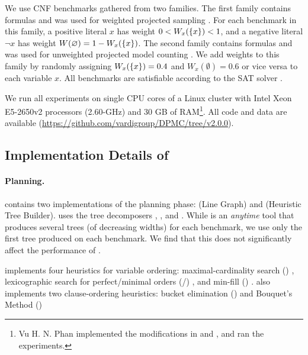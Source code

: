 We use \benchmarks{} CNF benchmarks gathered from two families.
The first family contains \wapsBenchmarks{} formulas and was used for weighted projected sampling \cite{gupta2019waps}.
For each benchmark in this family, a positive literal $x$ has weight $0 < W_x(\left\{ x \right\}) < 1$, and a negative literal $\neg x$ has weight $W(\varnothing) = 1 - W_x(\left\{ x \right\})$.
The second family contains \birdBenchmarks{} formulas and was used for unweighted projected model counting \cite{soos2019bird}.
We add weights to this family by randomly assigning $W_x(\left\{ x \right\}) = 0.4$ and $W_x(\emptyset) = 0.6$ or vice versa to each variable $x$.
All \benchmarks{} benchmarks are satisfiable according to the SAT solver \sat{} \cite{soos2009extending}.

We run all experiments on single CPU cores of a Linux cluster with Intel Xeon E5-2650v2 processors (2.60-GHz) and 30 GB of RAM\footnote{
Vu H. N. Phan implemented the modifications in \Htb{} and \Dmc{}, and ran the experiments.}.
All code and data are available (\url{https://github.com/vardigroup/DPMC/tree/v2.0.0}).

\noindent

\subsection{Implementation Details of }
\label{sec:procount:experiments:impl}

\paragraph{Planning.} 
 contains two implementations of the planning phase: \Lg{} (Line Graph) and \Htb{} (Heuristic Tree Builder).
\Lg{} uses the tree decomposers \flowcutter{} \cite{strasser2017computing}, \htd{} \cite{AMW17}, and \tamaki{} \cite{Tamaki17}.
While \Lg{} is an \emph{anytime} tool that produces several trees (of decreasing widths) for each benchmark, we use only the first tree produced on each benchmark.
We find that this does not significantly affect the performance of \procount{}.

\htb{} implements four heuristics for variable ordering: maximal-cardinality search (\mcs{}) \cite{tarjan1984simple}, lexicographic search for perfect/minimal orders (\lexp/\lexm{}) \cite{koster2001treewidth}, and min-fill (\minfill{}) \cite{dechter03}.
\htb{} also implements two clause-ordering heuristics: bucket elimination (\be) \cite{dechter99} and Bouquet's Method (\bm) \cite{bouquet1999gestion}%

